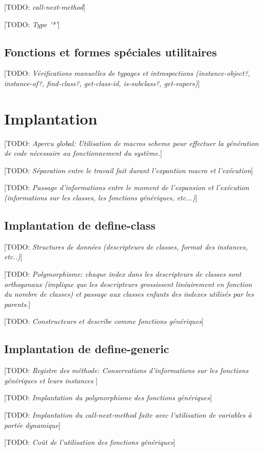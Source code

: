 \documentclass[12pt,oneside,letterpaper,francais]{book}
\newcommand{\todo}[1]{[TODO: {\it #1}]}
\begin{document}
\todo{call-next-method}

\todo{Type '*'}

\subsection{Fonctions et formes spéciales utilitaires}

\todo{Vérifications manuelles de typages et introspections
  (instance-object?, instance-of?, find-class?, get-class-id,
  is-subclass?, get-supers)}




\section{Implantation}
\todo{Apercu global: Utilisation de macros scheme pour effectuer la
  génération de code nécessaire au fonctionnement du système.}

\todo{Séparation entre le travail fait durant l'expantion macro et
  l'exécution}

\todo{Passage d'informations entre le moment de l'expansion et
  l'exécution (informations sur les classes, les fonctions génériques,
  etc...)}

\subsection{Implantation de define-class}
\todo{Structures de données (descripteurs de classes, format des
  instances, etc..)}

\todo{Polymorphisme: chaque index dans les descripteurs de classes
  sont orthogonaux (implique que les descripteurs grossissent
  linéairement en fonction du nombre de classes) et passage aux
  classes enfants des indexes utilisés par les parents.}

\todo{Constructeurs et describe comme fonctions génériques}

\subsection{Implantation de define-generic}
\todo{Registre des méthode: Conservations d'informations sur les
  fonctions génériques et leurs instances }

\todo{Implantation du polymorphisme des fonctions génériques}

\todo{Implantation du call-next-method faite avec l'utilisation de
  variables à portée dynamique}

\todo{Coût de l'utilisation des fonctions génériques}
\end{document}
